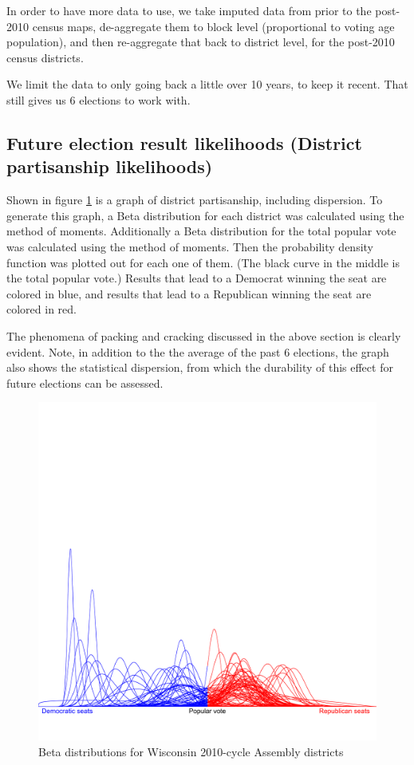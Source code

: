 \documentclass[preprint,12pt]{article}
\begin{document}
In order to have more data to use, we take imputed data from prior to the post-2010 census maps, de-aggregate them to block level (proportional to voting age population), and then re-aggregate that back to district level, for the post-2010 census districts.
 
We limit the data to only going back a little over 10 years, to keep it recent.  That still gives us 6 elections to work with.
 
\subsection{Future election result likelihoods (District partisanship likelihoods)}
 
Shown in figure \ref{fig:Betas} is a graph of district partisanship, including dispersion.  To generate this graph, a Beta distribution for each district was calculated using the method of moments.  Additionally a Beta distribution for the total popular vote was calculated using the method of moments.  Then the probability density function was plotted out for each one of them.  (The black curve in the middle is the total popular vote.) Results that lead to a Democrat winning the seat are colored in blue, and results that lead to a Republican winning the seat are colored in red.
 
The phenomena of packing and cracking discussed in the above section is clearly evident.  Note, in addition to the the average of the past 6 elections, the graph also shows the statistical dispersion, from which the durability of this effect for future elections can be assessed.

\begin{figure}[htb!]
    \begin{center}
        \includegraphics[scale=0.25]{../Figures/WI2010/betas.png}
        \caption{Beta distributions for Wisconsin 2010-cycle Assembly districts}\label{fig:Betas}
    \end{center}
\end{figure}
 
\end{document}
